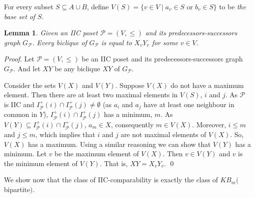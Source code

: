 \documentclass{article}
\newcommand{\define}[1]{\emph{#1}}
\newcommand{\mP}{\ensuremath{\mathcal{P}}}
\newtheorem{lemma}{Lemma}
\begin{document}
For    every    subset    $S     \subseteq    A    \cup    B$,    define
$V(S) = \{v  \in V \mid a_v \in  S $ or $b_v \in S\}$  to be \define{the
  base set of $S$}.

\begin{lemma}\label{lem.XY=XvYv}
  Given an  IIC poset  $\mP =  (V,\leq)$ and  its predecessors-successors
  graph $G_{\mP}$.  Every biclique of $G_{\mP}$ is equal to $X_vY_v$ for
  some $v \in V$.
\end{lemma}
\begin{proof}
  Let $\mP  = (V,\leq)$ be  an IIC poset and  its predecessors-successors
  graph $G_{\mP}$. And let $XY$ be any biclique $XY$ of $G_{\mP}$.

  Consider the  sets $V(X)$ and  $V(Y)$.  Suppose  $V(X)$ do not  have a
  maximum  element. Then  there are  at  least two  maximal elements  in
  $V(S)$,     $i$    and     $j$.      As    $\mP$     is    IIC     and
  $I_{\mP}^+(i) \cap  I_{\mP}^+(j) \neq  \emptyset$ (as $a_i$  and $a_j$
  have    at    least    one    neighbour    in    common    in    $Y$),
  $I_{\mP}^+(i)   \cap   I_{\mP}^+(j)$   has   a   minimum,   $m$.    As
  $V(Y)  \subseteq   I_{\mP}^+(i)  \cap  I_{\mP}^+(j)$,  $a_m   \in  X$,
  consequently $m \in V(X)$. Moreover, $i  \leq m$ and $j \leq m$, which
  implies that  $i$ and  $j$ are  not maximal  elements of  $V(X)$.  So,
  $V(X)$ has  a maximum.   Using a  similar reasoning  we can  show that
  $V(Y)$ has a minimum. Let $v$  be the maximum element of $V(X)$.  Then
  $v  \in V(Y)$  and $v$  is  the minimum  element of  $V(Y)$. That  is,
  $XY = X_vY_v$.
  \qed
\end{proof}

We show now that the class  of IIC-comparability is exactly the class of
$KB_m($bipartite$)$. 
\end{document}
